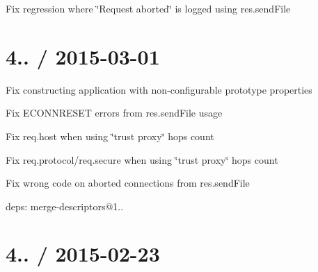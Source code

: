 {\ttfamily }

{\ttfamily 
\begin{DoxyItemize}
\item Fix regression where {\ttfamily \char`\"{}\+Request aborted\char`\"{}} is logged using {\ttfamily res.\+send\+File}
\end{DoxyItemize}}

{\ttfamily \section*{4.. / 2015-\/03-\/01 }}

{\ttfamily }

{\ttfamily 
\begin{DoxyItemize}
\item Fix constructing application with non-\/configurable prototype properties
\item Fix {\ttfamily E\+C\+O\+N\+N\+R\+E\+S\+ET} errors from {\ttfamily res.\+send\+File} usage
\item Fix {\ttfamily req.\+host} when using \char`\"{}trust proxy\char`\"{} hops count
\item Fix {\ttfamily req.\+protocol}/{\ttfamily req.\+secure} when using \char`\"{}trust proxy\char`\"{} hops count
\item Fix wrong {\ttfamily code} on aborted connections from {\ttfamily res.\+send\+File}
\item deps\+: merge-\/descriptors@1..
\end{DoxyItemize}}

{\ttfamily \section*{4.. / 2015-\/02-\/23 }}

{\ttfamily }

